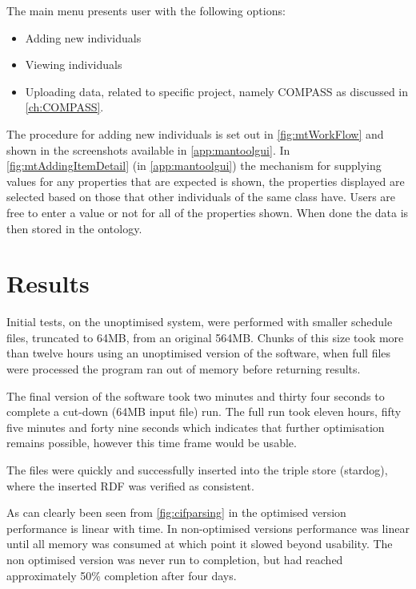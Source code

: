 The main menu presents user with the following options:
\begin{itemize}
    \item Adding new individuals
    \item Viewing individuals
    \item Uploading data, related to specific project, namely COMPASS as discussed in \autoref{ch:COMPASS}. 
\end{itemize}

The procedure for adding new individuals is set out in \autoref{fig:mtWorkFlow} and shown in the screenshots available in \autoref{app:mantoolgui}. In \autoref{fig:mtAddingItemDetail} (in  \autoref{app:mantoolgui}) the mechanism for supplying values for any properties that are expected is shown, the properties displayed are selected based on those that other individuals of the same class have. Users are free to enter a value or not for all of the properties shown. When done the data is then stored in the ontology.

\section{Results} 
Initial tests, on the unoptimised system, were performed with smaller schedule files, truncated to 64MB, from an original 564MB. Chunks of this size took more than twelve hours using an unoptimised version of the software, when full files were processed the program ran out of memory before returning results.

The final version of the software took two minutes and thirty four seconds to complete a cut-down (64MB input file) run. The full run took eleven hours, fifty five minutes and forty nine seconds which indicates that further optimisation remains possible, however this time frame would be usable.  

The files were quickly and successfully inserted into the triple store (stardog), where the inserted RDF was verified as consistent. 

As can clearly been seen from \autoref{fig:cifparsing} in the optimised version performance is linear with time.  In non-optimised versions performance was linear until all memory was consumed at which point it slowed beyond usability. The non optimised version was never run to completion, but had reached approximately 50\% completion after four days. 

